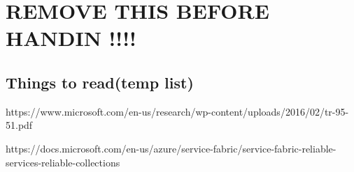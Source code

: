\documentclass[a4paper,10pt,titlepage]{report}
\begin{document}
%




\chapter{REMOVE THIS BEFORE HANDIN !!!!}

\section{Things to read(temp list)}

https://www.microsoft.com/en-us/research/wp-content/uploads/2016/02/tr-95-51.pdf

https://docs.microsoft.com/en-us/azure/service-fabric/service-fabric-reliable-services-reliable-collections
\end{document}
